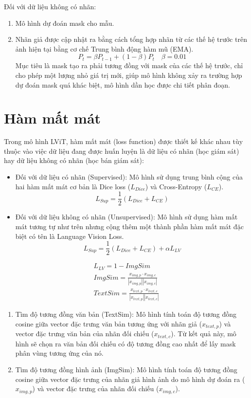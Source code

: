 Đối với dữ liệu không có nhãn:
\begin{enumerate}
    \item Mô hình dự đoán mask cho mẫu.
    \item Nhãn giả được cập nhật ra bằng cách tổng hợp nhãn từ các thế hệ trước trên ảnh hiện tại bằng cơ chế Trung bình động hàm mũ (EMA).
    \[
    P_t = \beta P_{t-1} + (1 - \beta) P_t \quad \beta = 0.01
    \]
    Mục tiêu là mask tạo ra phải tương đồng với mask của các thế hệ trước, chỉ cho phép một lượng nhỏ giá trị mới, giúp mô hình không xảy ra trường hợp dự đoán mask quá khác biệt, mô hình dần học được chi tiết phân đoạn.
\end{enumerate}

\section{Hàm mất mát}
Trong mô hình LViT, hàm mất mát (loss function) được thiết kế khác nhau tùy thuộc vào việc dữ liệu đang được huấn luyện là dữ liệu có nhãn (học giám sát) hay dữ liệu không có nhãn (học bán giám sát):
    \begin{itemize}
        \item Đối với dữ liệu có nhãn (Supervised): Mô hình sử dụng trung bình cộng của hai hàm mất mát cơ bản là Dice loss ($L_{Dice}$) và Cross-Entropy ($L_{CE}$).
        \[
            L_{Sup} = \frac{1}{2}(L_{Dice} + L_{CE})
        \]
        \item Đối với dữ liệu không có nhãn (Unsupervised): Mô hình sử dụng hàm mất mát tương tự như trên nhưng cộng thêm một thành phần hàm mất mát đặc biệt có tên là Language Vision Loss.
        \[
            L_{Sup} = \frac{1}{2}(L_{Dice} + L_{CE}) + \alpha L_{LV}
        \]
    \end{itemize}
    \begin{align*}
        L_{LV} = 1 - ImgSim \\
        ImgSim = \frac{x_{img, p} \cdot x_{img, c}}{|x_{img, p}||x_{img, c}|} \\
        TextSim = \frac{x_{text, p} \cdot x_{text, c}}{|x_{text, p}||x_{text, c}|}
    \end{align*}
    \begin{enumerate}
        \item Tìm độ tương đồng văn bản (TextSim): Mô hình tính toán độ tương đồng cosine giữa vector đặc trưng văn bản tương ứng với nhãn giả ($x_{text,p}$) và vector đặc trưng văn bản của nhãn đối chiếu ($x_{text,c}$). Từ kết quả này, mô hình sẽ chọn ra văn bản đối chiếu có độ tương đồng cao nhất để lấy mask phân vùng tương ứng của nó.
        
        \item Tìm độ tương đồng hình ảnh (ImgSim): Mô hình tính toán độ tương đồng cosine giữa vector đặc trưng của nhãn giả hình ảnh do mô hình dự đoán ra ($x_{img,p}$) và vector đặc trưng của nhãn đối chiếu ($x_{img,c}$).
    \end{enumerate}

